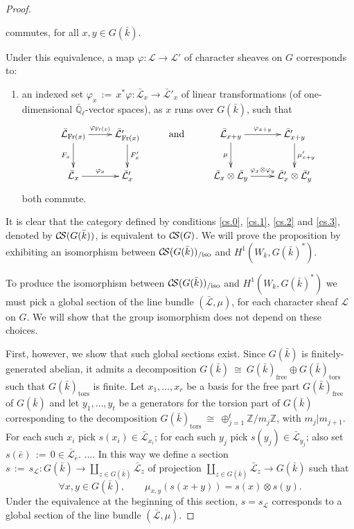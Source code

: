 \documentclass[11pt]{amsart}
\makeatletter
\theoremstyle{plain}
\theoremstyle{definition}
\theoremstyle{remark}
\newcommand{\ZZ}{{\mathbb{Z}}}
\newcommand{\EE}{\mathbb{\bar Q}_\ell}
\newcommand{\bFq}{\bar{k}}
\newcommand{\Fq}{k}
\newcommand{\Frob}{{\operatorname{Fr}}}
\newcommand{\cdef}[1]{{{\color{cyan}#1}\index{#1}}}
\newcommand{\ceq}{{\, :=\, }}
\newcommand{\iso}{{\ \cong\ }}
\newcommand{\cs}[1]{{\mathcal{#1}}}
\newcommand{\gcs}[1]{{\mathcal{\bar #1}}}
\newcommand{\CS}{{\mathcal{C\hskip-1.8pt S}}}
\newcommand{\labitem}[2]{%
\def\@itemlabel{\textbf{#1}}
\item
\def\@currentlabel{#1}\label{#2}}
\newcommand\Clifton[1]{\marginpar{\smaller\smaller CC: #1}}
\makeatother
\begin{document}
\begin{proof}
\begin{enumerate}
\[{}
\]
commutes, for all $x,y\in G(\bFq)$.
\end{enumerate}
Under this equivalence, a map $\varphi : \cs{L} \to \cs{L'}$ of character sheaves on $G$ corresponds to:
\begin{enumerate}
\labitem{(cs.3)}{cs.3} an indexed set $\varphi_x \ceq x^*\varphi: \gcs{L}_x \to \gcs{L'}_x$ of linear transformations (of one-dimensional $\EE$-vector spaces), as $x$ runs over $G(\bFq)$, such that
\[
\xymatrix{
\ar[d]_{F_x} \gcs{L}_{\Frob(x)} \ar[r]^{\varphi_{\Frob(x)}} & \ar[d]^{F_x'} \gcs{L'}_{\Frob(x)} &\text{and}& \ar[d]_{\mu} \gcs{L}_{x+y} \ar[r]^{\varphi_{x+y}} & \ar[d]^{\mu'_{x+y}} \gcs{L'}_{x+y} \\
\gcs{L}_x \ar[r]^{\varphi_x} & \gcs{L'}_x && \gcs{L}_x\otimes\gcs{L}_y \ar[r]^{\varphi_x\otimes \varphi_y} & \gcs{L'}_x \otimes \gcs{L'}_y\\
}
\]
both commute.
\end{enumerate}
It is clear that the category defined by conditions \ref{cs.0}, \ref{cs.1}, \ref{cs.2} and \ref{cs.3}, denoted by \cdef{$\CS(G(\bFq))$}, is equivalent to $\CS(G)$. We will prove the proposition by exhibiting an isomorphism between $\CS(G(\bFq))_{/\text{iso}}$ and $H^1(W_{\Fq}, G(\bFq)^*)$.

To produce the isomorphism between $\CS(G(\bFq))_{/\text{iso}}$ and $H^1(W_{\Fq}, G(\bFq)^*)$ we must pick a global section of the line bundle $(\gcs{L},\mu)$, for each character sheaf $\cs{L}$ on $G$. We will show that the group isomorphism does not depend on these choices. 

First, however, we show that such global sections exist.
Since $G(\bFq)$ is finitely-generated abelian, it admits a decomposition $G(\bFq) \iso G(\bFq)_\text{free} \oplus G(\bFq)_\text{tors}$ such that $G(\bFq)_\text{tors}$ is finite.
Let $x_1, \ldots , x_r$ be a basis for the free part $G(\bFq)_\text{free}$ of $G(\bFq)$ and let $y_1, \ldots , y_t$ be a generators for the torsion part of $G(\bFq)$ corresponding to the decomposition $G(\bFq)_\text{tors} \iso \oplus_{j=1}^t \ZZ/m_j\ZZ$, with $m_j \vert m_{j+1}$. For each such $x_i$ pick $s(x_i)\in \gcs{L}_{x_i}$; for each such $y_j$ pick $s(y_j) \in \gcs{L}_{y_j}$; also set $s({\bar e}) \ceq 0 \in \gcs{L}_{\bar e}$. .... \Clifton{I'll finish this later.} In this way we define a section $s \ceq s_\cs{L} : G(\bFq) \to \coprod_{z\in G(\bFq)} \gcs{L}_z$ of projection $\coprod_{z\in G(\bFq)} \gcs{L}_z \to G(\bFq)$ such that 
\begin{equation}\label{section}
\forall x,y \in G(\bFq), \qquad \mu_{x,y}(s(x+y)) = s(x)\otimes s(y).
\end{equation}
Under the equivalence at the beginning of this section, $s = s_\cs{L}$ corresponds to a global section of the line bundle $(\gcs{L},\mu)$.


\end{proof}
\end{document}
